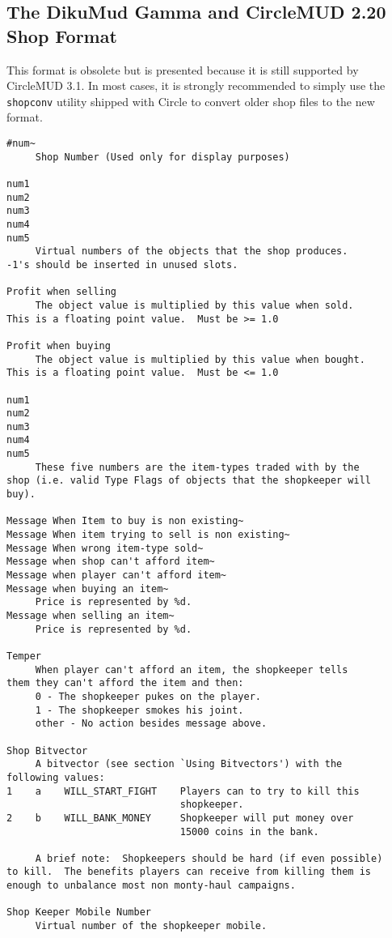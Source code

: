 \documentclass[11pt]{article}
\begin{document}
\subsection{The DikuMud Gamma and CircleMUD 2.20 Shop Format}
This format is obsolete but is presented because it is still supported by CircleMUD 3.1.  In most cases, it is strongly recommended to simply use the \texttt{shopconv} utility shipped with Circle to convert older shop files to the new format.
\begin{verbatim}
#num~
     Shop Number (Used only for display purposes)

num1
num2
num3
num4
num5
     Virtual numbers of the objects that the shop produces.
-1's should be inserted in unused slots.

Profit when selling
     The object value is multiplied by this value when sold.
This is a floating point value.  Must be >= 1.0

Profit when buying
     The object value is multiplied by this value when bought.
This is a floating point value.  Must be <= 1.0

num1
num2
num3
num4
num5
     These five numbers are the item-types traded with by the
shop (i.e. valid Type Flags of objects that the shopkeeper will
buy).

Message When Item to buy is non existing~
Message When item trying to sell is non existing~
Message When wrong item-type sold~
Message when shop can't afford item~
Message when player can't afford item~
Message when buying an item~
     Price is represented by %d.
Message when selling an item~
     Price is represented by %d.

Temper
     When player can't afford an item, the shopkeeper tells
them they can't afford the item and then:
     0 - The shopkeeper pukes on the player.
     1 - The shopkeeper smokes his joint.
     other - No action besides message above.

Shop Bitvector
     A bitvector (see section `Using Bitvectors') with the
following values:
1    a    WILL_START_FIGHT    Players can to try to kill this
                              shopkeeper.
2    b    WILL_BANK_MONEY     Shopkeeper will put money over
                              15000 coins in the bank.

     A brief note:  Shopkeepers should be hard (if even possible)
to kill.  The benefits players can receive from killing them is
enough to unbalance most non monty-haul campaigns.

Shop Keeper Mobile Number
     Virtual number of the shopkeeper mobile.


\end{verbatim}
\end{document}
